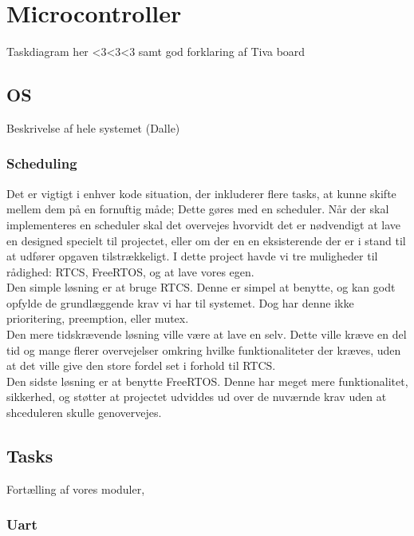 \section{Microcontroller}

Taskdiagram her <3<3<3 samt god forklaring af Tiva board

\subsection{OS}

Beskrivelse af hele systemet (Dalle)

\subsubsection{Scheduling}
Det er vigtigt i enhver kode situation, der inkluderer flere tasks, at kunne skifte mellem dem på en fornuftig måde; Dette gøres med en scheduler. Når der skal implementeres en scheduler skal det overvejes hvorvidt det er nødvendigt at lave en designed specielt til projectet, eller om der en en eksisterende der er i stand til at udfører opgaven tilstrækkeligt. I dette project havde vi tre muligheder til rådighed: RTCS, FreeRTOS, og at lave vores egen.
\\
Den simple løsning er at bruge RTCS. Denne er simpel at benytte, og kan godt opfylde de grundlæggende krav vi har til systemet. Dog har denne ikke prioritering, preemption, eller mutex.
\\
Den mere tidskrævende løsning ville være at lave en selv. Dette ville kræve en del tid og mange flerer overvejelser omkring hvilke funktionaliteter der kræves, uden at det ville give den store fordel set i forhold til RTCS.
\\
Den sidste løsning er at benytte FreeRTOS. Denne har meget mere funktionalitet, sikkerhed, og støtter at projectet udviddes ud over de nuværnde krav uden at shceduleren skulle genovervejes.

\subsection{Tasks}

Fortælling af vores moduler,

\subsubsection{Uart}


